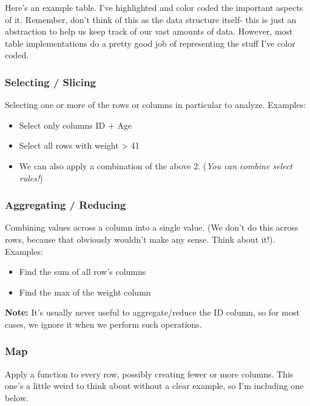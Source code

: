 \documentclass[english, 10pt]{article}
\begin{document}
\hfill \break Here's an example table. I've highlighted and color coded the important aspects of it. Remember, don't think of this as the data structure itself- this is just an abstraction to help us keep track of our vast amounts of data. However, most table implementations do a pretty good job of representing the stuff I've color coded.\\

\subsubsection{Selecting / Slicing}

Selecting one or more of the rows or columns in particular to analyze. Examples:

\begin{itemize}
	\item Select only columns ID + Age
	\item Select all rows with weight > 41
	\item We can also apply a combination of the above 2. (\textit{You can combine select rules!})
\end{itemize}

\subsubsection{Aggregating / Reducing}

Combining values across a column into a single value. (We don't do this across rows, because that obviously wouldn't make any sense. Think about it!). Examples:

\begin{itemize}
	\item Find the sum of all row's columns
	\item Find the max of the weight column
\end{itemize}

\textbf{Note:} It's usually never useful to aggregate/reduce the ID column, so for most cases, we ignore it when we perform such operations.

\subsubsection{Map}

Apply a function to every row, possibly creating fewer or more columns. This one's a little weird to think about without a clear example, so I'm including one below.\\
\end{document}
